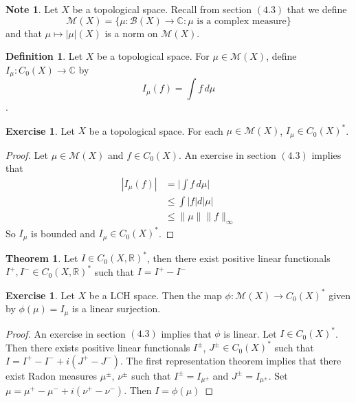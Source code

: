 \documentclass{book}
\theoremstyle{definition}
\newtheorem{defn}[definition]{Definition}
\newtheorem{note}[definition]{Note}
\newtheorem{thm}[definition]{Theorem}
\newtheorem{ex}[definition]{Exercise}
\newcommand{\C}{\mathbb{C}}
\newcommand{\R}{\mathbb{R}}
\newcommand{\MB}{\mathcal{B}}
\newcommand{\MM}{\mathcal{M}}
\newcommand{\lex}[1]{\label{ex:#1}}
\newcommand{\ld}[1]{\label{defn:#1}}
\DeclareMathOperator*{\0}{\mbf{0}}
\DeclareMathOperator*{\1}{\mbf{1}}
\newcommand{\dmu}{\, d \mu}
\begin{document}
	\begin{note}
	Let $X$ be a topological space. Recall from section $(4.3)$ that we define $$\MM(X) = \{\mu:\MB(X) \rightarrow \C: \mu \text{ is a complex measure}\}$$ and that $\mu \mapsto |\mu|(X)$ is a norm on $\MM(X)$. 
	\end{note}		
	
	\begin{defn} \ld{00000} 
	Let $X$ be a topological space. For $\mu \in \MM(X)$, define $I_{\mu} :C_0(X) \rightarrow \C$ by $$I_{\mu} (f) = \int f \dmu$$.
	\end{defn}
	
	\begin{ex} \lex{00000} 
	Let $X$ be a topological space. For each $\mu \in \MM(X)$, $I_\mu \in C_0(X)^*$.
	\end{ex}
	
	\begin{proof}
	Let $\mu \in \MM(X)$ and $f \in C_0(X)$. An exercise in section $(4.3)$ implies that 
	\begin{align*}
	|I_{\mu}(f)| 
	&= \bigg| \int f \dmu \bigg| \\
	& \leq \int |f| d |\mu| \\
	& \leq \| \mu \| \|f\|_{\infty}
	\end{align*}
	So $I_{\mu}$ is bounded and $I_{\mu} \in C_0(X)^*$.
	\end{proof}
	
	\begin{thm}
	Let $I \in C_0(X, \R)^*$, then there exist positive linear functionals $I^+, I^- \in C_0(X, \R)^*$ such that $I = I^+ - I^-$
	\end{thm}
	
	\begin{ex} \lex{00000} 
	Let $X$ be a LCH space. Then the map $ \phi: \MM(X) \rightarrow C_0(X)^*$ given by $\phi(\mu) = I_{\mu}$ is a linear surjection.
	\end{ex}
	
	\begin{proof}
	An exercise in section $(4.3)$ implies that $\phi$ is linear. Let $I \in C_0(X)^*$. Then there exists positive linear functionals $I^{\pm}$, $J^{\pm} \in C_0(X)^*$ such that $I = I^+ - I^- + i(J^+ - J^-)$. The first representation theorem implies that there exist Radon measures $\mu^{\pm}$, $\nu^{\pm}$ such that $I^{\pm} = I_{\mu^{\pm}}$ and $J^{\pm} = I_{\mu^{\pm}}$. Set $\mu = \mu^+ - \mu^- +i(\nu^+ - \nu ^-)$. Then $I = \phi(\mu)$
	\end{proof}
	
\end{document}
